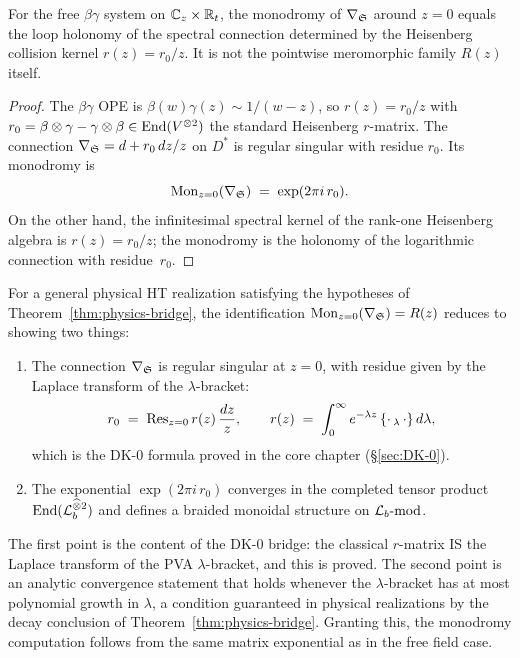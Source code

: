 \begin{proposition}
\label{prop:betagamma-monodromy}
For the free $\beta\gamma$ system on $\mathbb C_z \times \mathbb R_t$, the
monodromy of $\nabla_{\mathfrak{S}}$ around $z = 0$ equals the loop holonomy of
the spectral connection determined by the Heisenberg collision kernel
$r(z)=r_0/z$. It is not the pointwise meromorphic family $R(z)$ itself.
\end{proposition}

\begin{proof}
The $\beta\gamma$ OPE is $\beta(w)\gamma(z) \sim 1/(w-z)$, so $r(z) = r_0/z$ with $r_0 = \beta \otimes \gamma - \gamma \otimes \beta \in \mathrm{End}(V^{\otimes 2})$ the standard Heisenberg $r$-matrix.
The connection $\nabla_{\mathfrak{S}} = d + r_0\,dz/z$ on $D^*$ is regular singular with residue $r_0$.
Its monodromy is
\[
\mathrm{Mon}_{z=0}(\nabla_{\mathfrak{S}}) \;=\; \exp(2\pi i\, r_0).
\]
On the other hand, the infinitesimal spectral kernel of the rank-one
Heisenberg algebra is $r(z)=r_0/z$; the monodromy is the holonomy of
the logarithmic connection with residue~$r_0$.
\end{proof}

\begin{strategy}
\label{strat:general-monodromy}
For a general physical HT realization satisfying the hypotheses of
Theorem~\ref{thm:physics-bridge}, the identification
$\mathrm{Mon}_{z=0}(\nabla_{\mathfrak{S}}) = R(z)$ reduces to showing two things:
\begin{enumerate}
\item The connection $\nabla_{\mathfrak{S}}$ is regular singular at $z = 0$, with residue given by the Laplace transform of the $\lambda$-bracket:
\[
r_0 \;=\; \mathrm{Res}_{z=0}\, r(z)\,\frac{dz}{z}, \qquad r(z) \;=\; \int_0^\infty e^{-\lambda z}\, \{{\cdot}\,_\lambda\,{\cdot}\}\, d\lambda,
\]
which is the DK-0 formula proved in the core chapter (\S\ref{sec:DK-0}).
\item The exponential $\exp(2\pi i\, r_0)$ converges in the completed tensor product $\mathrm{End}(\mathcal{L}_b^{\widehat\otimes 2})$ and defines a braided monoidal structure on $\mathcal{L}_b\text{-}\mathrm{mod}$.
\end{enumerate}
The first point is the content of the DK-0 bridge: the classical $r$-matrix IS the Laplace transform of the PVA $\lambda$-bracket, and this is proved.
The second point is an analytic convergence statement that holds
whenever the $\lambda$-bracket has at most polynomial growth in
$\lambda$, a condition guaranteed in physical realizations by the
decay conclusion of Theorem~\ref{thm:physics-bridge}.
Granting this, the monodromy computation follows from the same matrix exponential as in the free field case.
\end{strategy}

